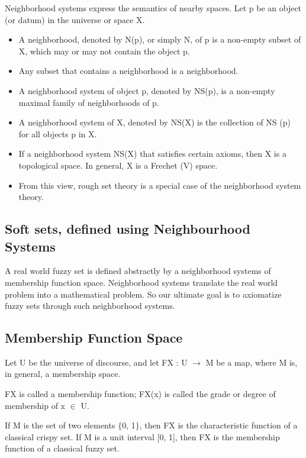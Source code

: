 \documentclass[12pt]{article} %
\begin{document}
Neighborhood systems express the semantics of
nearby spaces. Let p be an object (or datum) in the universe or
space X. 

\begin{itemize}
\item{A neighborhood, denoted by N(p), or simply N,
of p is a non-empty subset of X, which may or
may not contain the object p.}
\item{Any subset that contains a
neighborhood is a neighborhood.}
\item{A neighborhood
system of object p, denoted by NS(p), is a non-empty
maximal family of neighborhoods of p.}
\item{A neighborhood system of X, denoted by NS(X) is the
collection of NS (p) for all objects p in X.}
\item{If a
neighborhood system NS(X) that satisfies certain
axioms, then X is a topological space. In
general, X is a Frechet (V) space.}
\item{From this view, rough set theory is a special case of the
neighborhood system theory.}
\end{itemize}


\subsection{Soft sets, defined using Neighbourhood Systems}
A real world fuzzy set is defined abstractly by a neighborhood systems of membership function space. Neighborhood systems translate the real world problem into a mathematical problem. So our ultimate goal is to axiomatize fuzzy sets through such neighborhood
systems.


\subsection{Membership Function Space}
Let U be the universe of discourse, and let
FX : U \begin{math} \rightarrow \end{math} M
be a map, where M is, in general, a membership space. 

FX is called a membership function; FX(x) is called the grade or degree of membership of x \begin{math} \in \end{math} U. 

If M is the set of two elements $\{$0, 1$\}$, then FX is the
characteristic function of a classical crispy set. If M is a
unit interval [0, 1], then FX is the membership function of a
classical fuzzy set.
\end{document}

